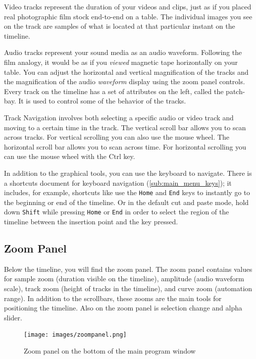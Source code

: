 Video tracks represent the duration of your videos and clips, just as if you placed real photographic film stock end-to-end on a table. 
The individual images you see on the track are samples of what is located at that particular instant on the timeline.

Audio tracks represent your sound media as an audio waveform. 
Following the film analogy, it would be as if you \textit{viewed} magnetic tape horizontally on your table. 
You can adjust the horizontal and vertical magnification of the tracks and the magnification of the audio \textit{waveform} display using the zoom panel controls. 
Every track on the timeline has a set of attributes on the left, called the patch-bay. 
It is used to control some of the behavior of the tracks.

Track Navigation involves both selecting a specific audio or video track and moving to a certain time in the track. 
The vertical scroll bar allows you to scan across tracks. 
For vertical scrolling you can also use the mouse wheel. 
The horizontal scroll bar allows you to scan across time. For horizontal scrolling you can use the mouse wheel with the Ctrl key.  

In addition to the graphical tools, you can use the keyboard to navigate.  
There is a shortcuts document for keyboard navigation (\ref{sub:main_menu_keys}); it includes, for example, shortcuts like use the \texttt{Home} and \texttt{End} keys to instantly go to the beginning or end of the timeline.  
Or in the default cut and paste mode, hold down \texttt{Shift} while pressing \texttt{Home} or \texttt{End} in order to select the region of the timeline between the insertion point and the key pressed.

\subsection{Zoom Panel}%
\label{sub:zoom_panel}

Below the timeline, you will find the zoom panel. 
The zoom panel contains values for sample zoom (duration visible on the timeline), amplitude (audio waveform scale), track zoom (height of tracks in the timeline), and curve zoom (automation range). 
In addition to the scrollbars, these zooms are the main tools for positioning the timeline.  
Also on the zoom panel is selection change and alpha slider.

\begin{figure}[htpb]
    \centering
    \texttt{[image: images/zoompanel.png]}
    \caption{Zoom panel on the bottom of the main program window}
    \label{fig:zoompanel}
\end{figure}

